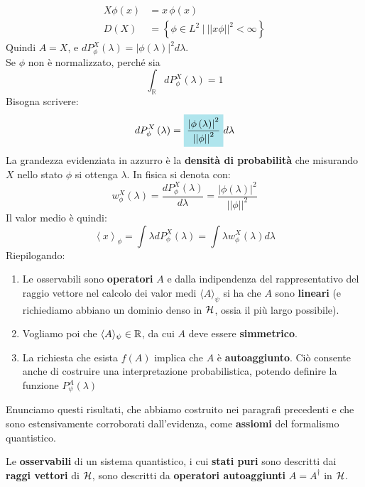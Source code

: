 \begin{align*}
    X\phi \left(x\right)&=x\,\phi \left(x\right)\\
    D\left(X\right)&=\left\{\phi\in L^2\ |\ \left|\left|x\phi\right|\right|^2<\infty\right\}
\end{align*}
Quindi $A=X$, e $dP_\phi^X(\lambda) = |\phi(\lambda)|^2 d\lambda$.\\
Se $\phi$  non è normalizzato, perché sia \[ \int_{\mathbb{R}}{dP_\phi^X\left(\lambda\right)}=1 \]
Bisogna scrivere:
\[
dP_\phi^X\left(\lambda\right)=\hlc{SkyBlue}{\frac{\left|\phi\left(\lambda\right)\right|^2}{\left|\left|\phi\right|\right|^2}}d\lambda 
\]
La grandezza evidenziata in azzurro è la \textbf{densità di probabilità} che misurando $X$ nello stato $\phi$ si ottenga $\lambda$. In fisica si denota con:
\[
w_\phi^X\left(\lambda\right)=\frac{dP_\phi^X\left(\lambda\right)}{d\lambda}=\frac{\left|\phi\left(\lambda\right)\right|^2}{\left|\left|\phi\right|\right|^2}
\]
Il valor medio è quindi:
\[
\left\langle x\right\rangle_\phi=\int \lambda  dP_\phi^X\left(\lambda\right)=\int \lambda  w_\phi^X\left(\lambda\right) d\lambda 
\]
Riepilogando: 
\begin{enumerate}
    \item Le osservabili sono \textbf{operatori} $A$ e dalla indipendenza del rappresentativo del raggio vettore nel calcolo dei valor medi $\langle A\rangle_\psi$ si ha che $A$ sono \textbf{lineari} (e richiediamo abbiano un dominio denso in $\mathcal{H}$, ossia il più largo possibile).
    \item Vogliamo poi che $\langle A \rangle_\psi \in \mathbb{R}$, da cui $A$ deve essere \textbf{simmetrico}.
    \item La richiesta che esista $f\left(A\right)$ implica che $A$ è \textbf{autoaggiunto}.  Ciò consente anche di costruire una interpretazione probabilistica, potendo definire la funzione $P_\psi^A\left(\lambda\right)$
\end{enumerate}
Enunciamo questi risultati, che abbiamo costruito nei paragrafi precedenti e che sono estensivamente corroborati dall'evidenza, come \textbf{assiomi} del formalismo quantistico.
\begin{axi}
Le \textbf{osservabili} di un sistema quantistico, i cui \textbf{stati puri} sono descritti dai \textbf{raggi vettori} di $\mathcal{H}$, sono descritti da \textbf{operatori autoaggiunti} $A=A^\dag$ in $\mathcal{H}$.
\end{axi}

